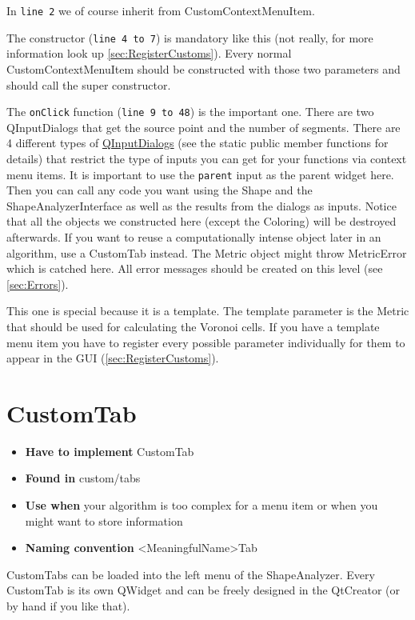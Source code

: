 In \texttt{line 2} we of course inherit from CustomContextMenuItem. 

The constructor (\texttt{line 4 to 7}) is mandatory like this (not really, for more information look up \ref{sec:RegisterCustoms}). Every normal CustomContextMenuItem should be constructed with those two parameters and should call the super constructor. 

The \texttt{onClick} function (\texttt{line 9 to 48}) is the important one. There are two QInputDialogs that get the source point and the number of segments. There are 4 different types of \href{http://qt-project.org/doc/qt-4.8/qinputdialog.html}{QInputDialogs} (see the static public member functions for details) that restrict the type of inputs you can get for your functions via context menu items. It is important to use the \texttt{parent} input as the parent widget here. 
Then you can call any code you want using the Shape and the ShapeAnalyzerInterface as well as the results from the dialogs as inputs. Notice that all the objects we constructed here (except the Coloring) will be destroyed afterwards. If you want to reuse a computationally intense object later in an algorithm, use a CustomTab instead.
The Metric object might throw MetricError which is catched here. All error messages should be created on this level (see \ref{sec:Errors}).

This one is special because it is a template. The template parameter is the Metric that should be used for calculating the Voronoi cells. If you have a template menu item you have to register every possible parameter individually for them to appear in the GUI (\ref{sec:RegisterCustoms}). 

\section{CustomTab}
\label{sec:CustomTab}

\begin{itemize}
	\item \textbf{Have to implement} CustomTab
	\item \textbf{Found in} custom/tabs
	\item \textbf{Use when} your algorithm is too complex for a menu item or when you might want to store information
	\item \textbf{Naming convention} <MeaningfulName>Tab
\end{itemize}

CustomTabs can be loaded into the left menu of the ShapeAnalyzer. Every CustomTab is its own QWidget and can be freely designed in the QtCreator (or by hand if you like that). 

